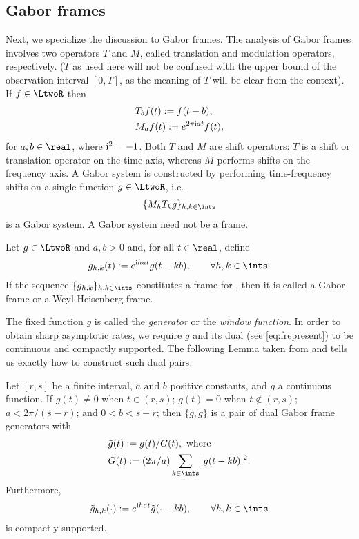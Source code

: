 \subsection{ Gabor frames}
Next, we specialize the discussion to Gabor frames. The analysis of Gabor frames involves two operators $T$ and $M$, called  translation and modulation operators, respectively. ($T$ as used here will not be confused with the upper bound of the observation interval $[0,T]$, as the meaning of $T$ will be clear from the context). If $f \in \LtwoR$ then 
\begin{align}
  & T_bf(t) := f(t -  b),  \notag\\
  & M_af(t) := e^{2\pi \mathrm{i} at}f(t), \notag 
  \label{}
\end{align}
for $a,b \in \real$, where $\mathrm{i}^2 = -1$. Both $T$ and $M$ are shift operators: $T$ is a shift or translation operator on the time axis, whereas $M$ performs shifts on the frequency axis. A Gabor system is constructed by performing time-frequency shifts on a single function $g \in \LtwoR$, i.e. 
\begin{align}
  \{M_h T_k g\}_{h,k \in \ints}\notag
  \label{}
\end{align}
is a Gabor system. A Gabor system need not be a frame.
\begin{defn}
  Let $g \in \LtwoR$ and $a,b >0$ and,  for all $t \in \real$, define  
\begin{align}
  g_{h,k}(t) := e^{\i h a t }g(t - k b), \qquad  \forall h,k \in \ints. \notag    
 \end{align}
  If the sequence $\{g_{h,k}\}_{h,k \in \ints}$ constitutes a  frame for \LtwoR, then it is called a Gabor frame or a Weyl-Heisenberg frame. 
\end{defn}
\noindent The fixed function $g$ is called  the \emph{generator} or the \emph{window function}.  
In order to obtain sharp asymptotic rates, we require $g$ and its dual \tg (see \eqref{eq:frepresent}) to be continuous and compactly supported. The following Lemma taken from \cite{Christensen2006} and \cite{Zhang2008} tells us exactly how to construct such dual pairs.
\begin{lem}\label{le:gabor}
  Let $[r,s]$ be a finite interval, $a\text{ and }b$ positive constants,  and $g$ a continuous function. If $g(t) \ne 0$ when $t \in (r,s)$; $g(t) = 0$ when $t \notin (r,s)$; $a < 2\pi/(s-r)$; and $0<b<s-r$; then  $\{g,\tilde{g}\}$ is a pair of dual Gabor frame generators with 
\begin{align}
  &\tilde{g}(t)  := g(t)/G(t), \text{ where} \label{eq:dualg}\\
  &G(t) := (2\pi/a)\sumi|g(t-kb)|^2.\label{eq:capg}
\end{align}
Furthermore, 
\begin{align}
  \tilde{g}_{h,k}(\cdot) := e^{\i h a t} \tilde{g}(\cdot - kb), \qquad \forall h, k \in \ints \label{eq:dualghk}
\end{align}
is compactly supported.   
\end{lem}
